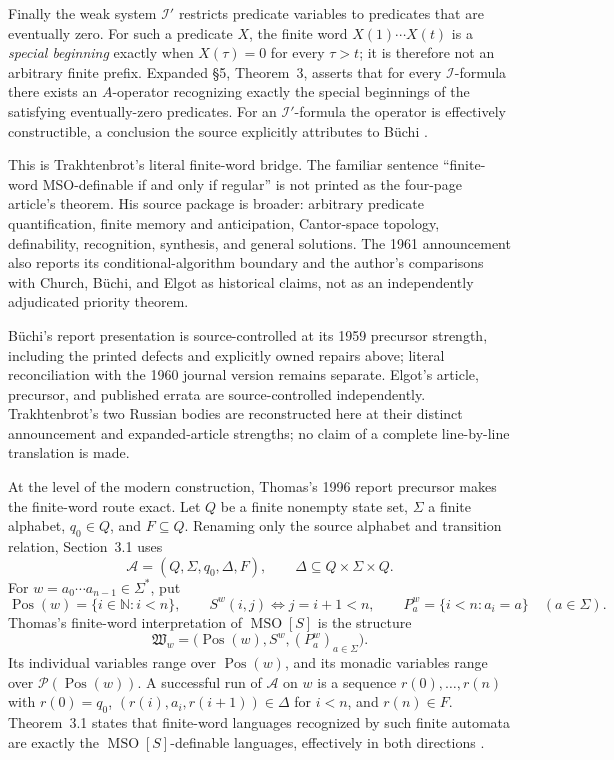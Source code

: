 Finally the weak system \(\mathcal I'\) restricts predicate variables to
predicates that are eventually zero.  For such a predicate \(X\), the finite
word \(X(1)\cdots X(t)\) is a \emph{special beginning} exactly when
\(X(\tau)=0\) for every \(\tau>t\); it is therefore not an arbitrary finite
prefix.  Expanded \S5, Theorem~3, asserts that for every \(\mathcal I\)-formula
there exists an \(A\)-operator recognizing exactly the special beginnings of
the satisfying eventually-zero predicates.  For an \(\mathcal I'\)-formula
the operator is effectively constructible, a conclusion the source explicitly
attributes to B\"uchi
\cite[pp.~124--131]{Trakhtenbrot1962Expanded}.

This is Trakhtenbrot's literal finite-word bridge.  The familiar sentence
\enquote{finite-word MSO-definable if and only if regular} is not printed as
the four-page article's theorem.  His source package is broader: arbitrary
predicate quantification, finite memory and anticipation, Cantor-space
topology, definability, recognition, synthesis, and general solutions.  The
1961 announcement also reports its conditional-algorithm boundary and the
author's comparisons with Church, B\"uchi, and Elgot as historical claims,
not as an independently adjudicated priority theorem.

B\"uchi's report presentation is source-controlled at its 1959 precursor
strength, including the printed defects and explicitly owned repairs above;
literal reconciliation with the 1960 journal version remains separate.
Elgot's article, precursor, and published errata are source-controlled
independently.  Trakhtenbrot's two Russian bodies are reconstructed here at
their distinct announcement and expanded-article strengths; no claim of a
complete line-by-line translation is made.

At the level of the modern construction, Thomas's 1996 report precursor makes
the finite-word route exact.  Let \(Q\) be a finite nonempty state set,
\(\Sigma\) a finite alphabet, \(q_0\in Q\), and \(F\subseteq Q\).  Renaming
only the source alphabet and transition relation, Section~3.1 uses
\[
 \mathcal A=(Q,\Sigma,q_0,\Delta,F),
 \qquad
 \Delta\subseteq Q\times\Sigma\times Q.
\]
For \(w=a_0\cdots a_{n-1}\in\Sigma^*\), put
\[
 \operatorname{Pos}(w)=\{i\in\mathbb N:i<n\},
 \qquad
 S^w(i,j)\Longleftrightarrow j=i+1<n,
 \qquad
 P_a^w=\{i<n:a_i=a\}\quad(a\in\Sigma).
\]
Thomas's finite-word interpretation of \(\operatorname{MSO}[S]\) is the
structure
\[
 \mathfrak W_w=
 \bigl(\operatorname{Pos}(w),S^w,(P_a^w)_{a\in\Sigma}\bigr).
\]
Its individual variables range over \(\operatorname{Pos}(w)\), and its monadic
variables range over \(\mathcal P(\operatorname{Pos}(w))\).  A successful run
of \(\mathcal A\) on \(w\) is a sequence \(r(0),\ldots,r(n)\) with
\(r(0)=q_0\),
\((r(i),a_i,r(i+1))\in\Delta\) for \(i<n\), and \(r(n)\in F\).
Theorem~3.1 states that finite-word languages recognized by such finite automata are
exactly the \(\operatorname{MSO}[S]\)-definable languages, effectively in both
directions \cite[\S3.1]{Thomas1996Report}.

